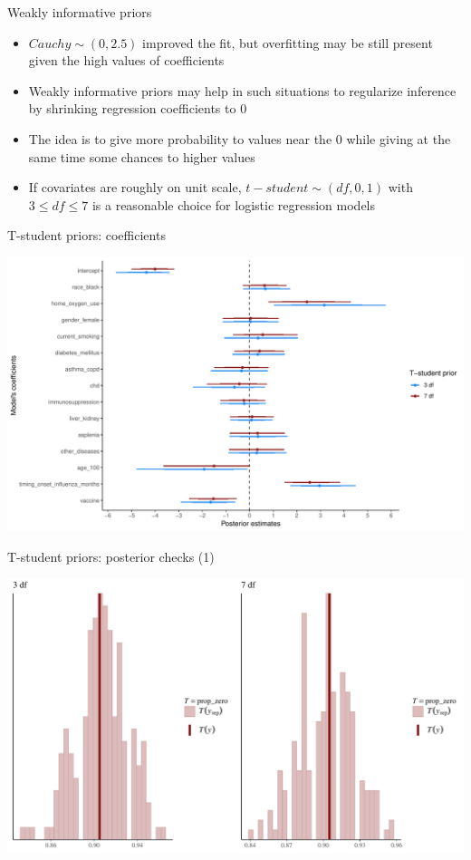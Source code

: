 \documentclass[ignorenonframetext,a4paper]{beamer}
\begin{document}
\begin{frame}{Weakly informative priors}

\begin{itemize}
\item
  \(Cauchy \sim \left( 0, 2.5 \right)\) improved the fit, but
  overfitting may be still present given the high values of coefficients
\item
  Weakly informative priors may help in such situations to regularize
  inference by shrinking regression coefficients to \(0\)
\item
  The idea is to give more probability to values near the \(0\) while
  giving at the same time some chances to higher values
\item
  If covariates are roughly on unit scale,
  \(t-student \sim \left(df, 0, 1 \right)\) with \(3 \leq df \leq 7\) is
  a reasonable choice for logistic regression models
\end{itemize}

\end{frame}

\begin{frame}{T-student priors: coefficients}

\includegraphics{DB_presentation_case_study_files/figure-beamer/unnamed-chunk-31-1.pdf}

\end{frame}

\begin{frame}{T-student priors: posterior checks (1)}

\includegraphics{DB_presentation_case_study_files/figure-beamer/unnamed-chunk-32-1.pdf}

\end{frame}
\end{document}

